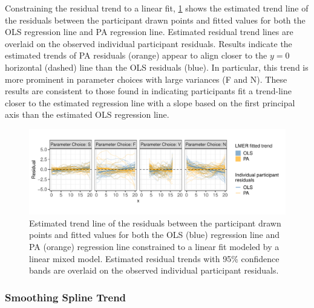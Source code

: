 \documentclass[12pt]{article}
\begin{document}
Constraining the residual trend to a linear fit,
\cref{fig:eyefitting-lmer-residualplots} shows the estimated trend line
of the residuals between the participant drawn points and fitted values
for both the OLS regression line and PA regression line. Estimated
residual trend lines are overlaid on the observed individual participant
residuals. Results indicate the estimated trends of PA residuals
(orange) appear to align closer to the \(y=0\) horizontal (dashed) line
than the OLS residuals (blue). In particular, this trend is more
prominent in parameter choices with large variances (F and N). These
results are consistent to those found in \citet{mosteller1981eye}
indicating participants fit a trend-line closer to the estimated
regression line with a slope based on the first principal axis than the
estimated OLS regression line.

\begin{figure}[tbp]

{\centering \includegraphics[width=1\linewidth,]{Eye-Fitting-Straight-Lines-in-the-Modern-Era_files/figure-latex/eyefitting-lmer-residualplots-1} 

}

\caption{Estimated trend line of the residuals between the participant drawn points and fitted values for both the OLS (blue) regression line and PA (orange) regression line constrained to a linear fit modeled by a linear mixed model. Estimated residual trends with 95\% confidence bands are overlaid on the observed individual participant residuals.}\label{fig:eyefitting-lmer-residualplots}
\end{figure}

\hypertarget{smoothing-spline-trend}{%
\subsubsection{Smoothing Spline Trend}\label{smoothing-spline-trend}}
\end{document}
